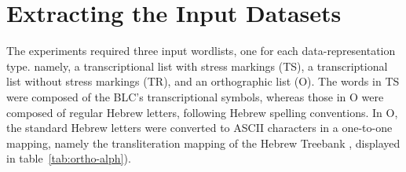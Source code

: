 \section{Extracting the Input Datasets}
\label{sec:extr}
The experiments required three input wordlists, one for each data-representation type. 
namely, a transcriptional list with stress markings (TS), a transcriptional list without stress markings  (TR), and an orthographic list (O).
The words in TS were composed of the BLC's transcriptional symbols, 
whereas those in O
were composed of regular Hebrew letters, following Hebrew spelling conventions. 
In O, the standard Hebrew letters were converted to ASCII characters in a one-to-one
mapping, namely the transliteration mapping of the Hebrew Treebank 
\citep{simaan-et-al:2001}, displayed in table~\ref{tab:ortho-alph}). %
